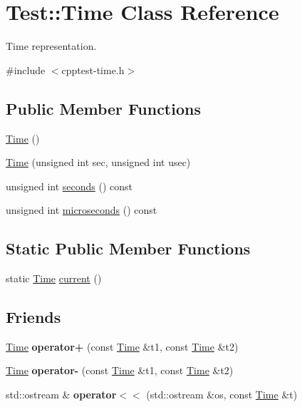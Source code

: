\hypertarget{class_test_1_1_time}{}\section{Test\+:\+:Time Class Reference}
\label{class_test_1_1_time}


Time representation.  




{\ttfamily \#include $<$cpptest-\/time.\+h$>$}

\subsection*{Public Member Functions}
\begin{DoxyCompactItemize}
\item 
\hyperlink{class_test_1_1_time_ae5c1089d2eb013c5b908ea95d924b733}{Time} ()
\item 
\hyperlink{class_test_1_1_time_afdc9c0556b8d71ecd8d621c2512154a5}{Time} (unsigned int sec, unsigned int usec)
\item 
unsigned int \hyperlink{class_test_1_1_time_a975b1bc3018cb82c5781edcbff7f32ff}{seconds} () const 
\item 
unsigned int \hyperlink{class_test_1_1_time_aee6b32be83b644a59ad89e539775ee54}{microseconds} () const 
\end{DoxyCompactItemize}
\subsection*{Static Public Member Functions}
\begin{DoxyCompactItemize}
\item 
static \hyperlink{class_test_1_1_time}{Time} \hyperlink{class_test_1_1_time_abb7a2480a7497c894994793da1a7b111}{current} ()
\end{DoxyCompactItemize}
\subsection*{Friends}
\begin{DoxyCompactItemize}
\item 
\hyperlink{class_test_1_1_time}{Time} {\bfseries operator+} (const \hyperlink{class_test_1_1_time}{Time} \&t1, const \hyperlink{class_test_1_1_time}{Time} \&t2)\hypertarget{class_test_1_1_time_ae2e555aa5b5c51e44b576d8baf48a2cd}{}\label{class_test_1_1_time_ae2e555aa5b5c51e44b576d8baf48a2cd}

\item 
\hyperlink{class_test_1_1_time}{Time} {\bfseries operator-\/} (const \hyperlink{class_test_1_1_time}{Time} \&t1, const \hyperlink{class_test_1_1_time}{Time} \&t2)\hypertarget{class_test_1_1_time_a09225563b0b317910b26c550ba74de64}{}\label{class_test_1_1_time_a09225563b0b317910b26c550ba74de64}

\item 
std\+::ostream \& {\bfseries operator$<$$<$} (std\+::ostream \&os, const \hyperlink{class_test_1_1_time}{Time} \&t)\hypertarget{class_test_1_1_time_a0287b008277738b9882ed96467e8b4f8}{}\label{class_test_1_1_time_a0287b008277738b9882ed96467e8b4f8}

\end{DoxyCompactItemize}
